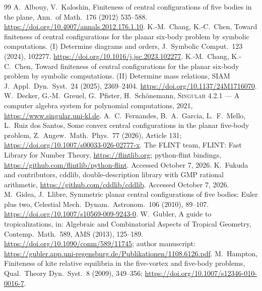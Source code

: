 \documentclass[11pt]{amsart}
\theoremstyle{definition}\newtheorem{definition}[theorem]{Definition}\theoremstyle{remark}\newtheorem{remark}[theorem]{Remark}
\begin{document}
\clearpage
\begin{thebibliography}{99}
 A.~Albouy, V.~Kaloshin, Finiteness of central configurations of five bodies in the plane, Ann.\ of Math.\ 176 (2012) 535--588. \url{https://doi.org/10.4007/annals.2012.176.1.10}.
 K.-M.~Chang, K.-C.~Chen, Toward finiteness of central configurations for the planar six-body problem by symbolic computations. (I) Determine diagrams and orders, J.\ Symbolic Comput.\ 123 (2024), 102277. \url{https://doi.org/10.1016/j.jsc.2023.102277}.
 K.-M.~Chang, K.-C.~Chen, Toward finiteness of central configurations for the planar six-body problem by symbolic computations. (II) Determine mass relations, SIAM J.\ Appl.\ Dyn.\ Syst.\ 24 (2025), 2369--2404. \url{https://doi.org/10.1137/24M1716070}.
 W.~Decker, G.-M.~Greuel, G.~Pfister, H.~Sch\"onemann, \textsc{Singular} 4.2.1 --- A computer algebra system for polynomial computations, 2021, \url{https://www.singular.uni-kl.de}.
 A.~C.~Fernandes, B.~A.~Garcia, L.~F.~Mello, L.~Ruiz dos Santos, Some convex central configurations in the planar five-body problem, Z.\ Angew.\ Math.\ Phys.\ 77 (2026), Article 131; \url{https://doi.org/10.1007/s00033-026-02777-x}.
 The FLINT team, FLINT: Fast Library for Number Theory, \url{https://flintlib.org}; python-flint bindings, \url{https://github.com/flintlib/python-flint}. Accessed October 7, 2026.
 K.~Fukuda and contributors, cddlib, double-description library with GMP rational arithmetic, \url{https://github.com/cddlib/cddlib}. Accessed October 7, 2026.
 M.~Gidea, J.~Llibre, Symmetric planar central configurations of five bodies: Euler plus two, Celestial Mech.\ Dynam.\ Astronom.\ 106 (2010), 89--107. \url{https://doi.org/10.1007/s10569-009-9243-0}.
 W.~Gubler, A guide to tropicalizations, in: Algebraic and Combinatorial Aspects of Tropical Geometry, Contemp.\ Math.\ 589, AMS (2013), 125--189. \url{https://doi.org/10.1090/conm/589/11745}; author manuscript: \url{https://gubler.app.uni-regensburg.de/Publikationen/1108.6126.pdf}.
 M.~Hampton, Finiteness of kite relative equilibria in the five-vortex and five-body problems, Qual.\ Theory Dyn.\ Syst.\ 8 (2009), 349--356; \url{https://doi.org/10.1007/s12346-010-0016-7}.

\end{thebibliography}
\end{document}
